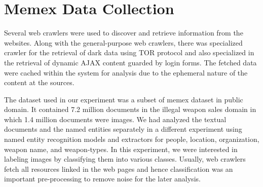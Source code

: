 \section{Memex Data Collection}
\label{sec:memex-datacollection}
Several web crawlers were used to discover and retrieve information from the websites.
Along with the general-purpose web crawlers, there was specialized crawler for the retrieval of dark data using TOR protocol \cite{} and also specialized in the retrieval of dynamic AJAX content guarded by login forms. The fetched data were cached within the system for analysis due to the ephemeral nature of the content at the sources.

The dataset used in our experiment was a subset of memex dataset in public domain. It contained 7.2 million documents in the illegal weapon sales domain in which 1.4 million documents were images. We had analyzed the textual documents and the named entities separately in a different experiment using named entity recognition models and extractors for people, location, organization, weapon name, and weapon-types. In this experiment, we were interested in labeling images by classifying them into various classes. Usually, web crawlers fetch all resources linked in the web pages and hence classification was an important pre-processing to remove noise for the later analysis.
